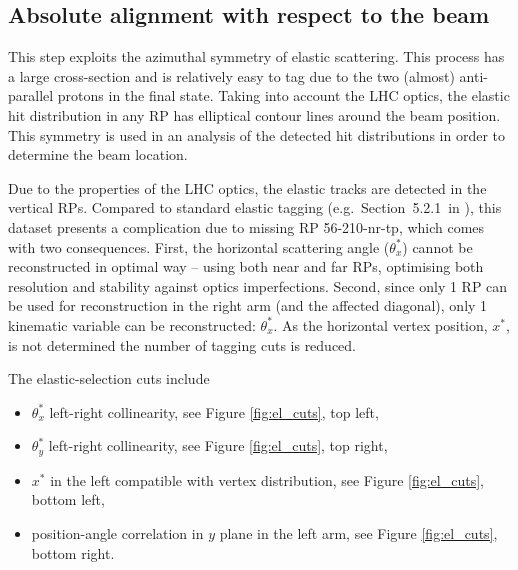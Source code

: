 \documentclass[TOTEM]{cern/cernphprep}
\begin{document}
\subsection{Absolute alignment with respect to the beam}
\label{s:calib-elastic}

This step exploits the azimuthal symmetry of elastic scattering. This process has a large cross-section and is relatively easy to tag due to the two (almost) anti-parallel protons in the final state. Taking into account the LHC optics, the elastic hit distribution in any RP has elliptical contour lines around the beam position. This symmetry is used in an analysis of the detected hit distributions in order to determine the beam location.

Due to the properties of the LHC optics, the elastic tracks are detected in the vertical RPs. Compared to standard elastic tagging (e.g.~Section~5.2.1~in \cite{totem-8tev-90m}), this dataset presents a complication due to missing RP 56-210-nr-tp, which comes with two consequences. First, the horizontal scattering angle ($\theta_x^*$) cannot be reconstructed in optimal way -- using both near and far RPs, optimising both resolution and stability against optics imperfections. Second, since only 1 RP can be used for reconstruction in the right arm (and the affected diagonal), only 1 kinematic variable can be reconstructed: $\theta_x^*$. As the horizontal vertex position, $x^*$, is not determined the number of tagging cuts is reduced.

The elastic-selection cuts include
\begin{itemize}[noitemsep]
\item $\theta_x^*$ left-right collinearity, see Figure \ref{fig:el_cuts}, top left,
\item $\theta_y^*$ left-right collinearity, see Figure \ref{fig:el_cuts}, top right,
\item $x^*$ in the left compatible with vertex distribution, see Figure \ref{fig:el_cuts}, bottom left,
\item position-angle correlation in $y$ plane in the left arm, see Figure \ref{fig:el_cuts}, bottom right.
\end{itemize}
\end{document}

